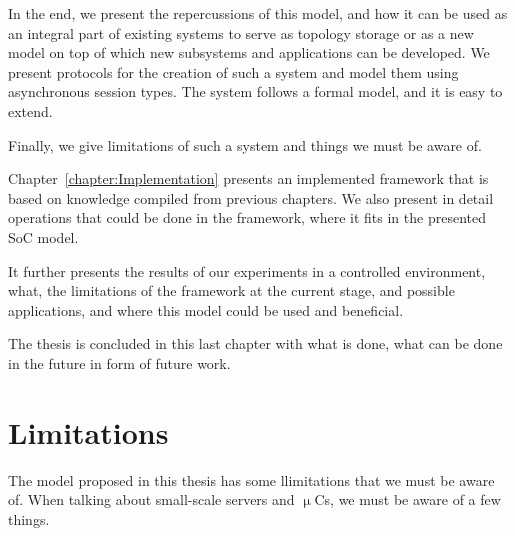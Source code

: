 In the end, we present the repercussions of this model, and how it can be used as an integral part of existing systems to serve as topology storage or as a new model on top of which new subsystems and applications can be developed. We present protocols for the creation of such a system and model them using asynchronous session types. The system follows a formal model, and it is easy to extend.

Finally, we give limitations of such a system and things we must be aware of.

Chapter~\ref{chapter:Implementation} presents an implemented framework that is based on knowledge compiled from previous chapters. We also present in detail operations that could be done in the framework, where it fits in the presented SoC model.

It further presents the results of our experiments in a controlled environment, what, the limitations of the framework at the current stage, and possible applications, and where this model could be used and beneficial.

The thesis is concluded in this last chapter with what  is done, what can be done in the future in form of future work.
%
%
\section{Limitations}\label{sec:limitations}
%
The model proposed in this thesis has some llimitations that we must be aware of. When talking about small-scale servers and $\upmu$Cs, we must be aware of a few things.

